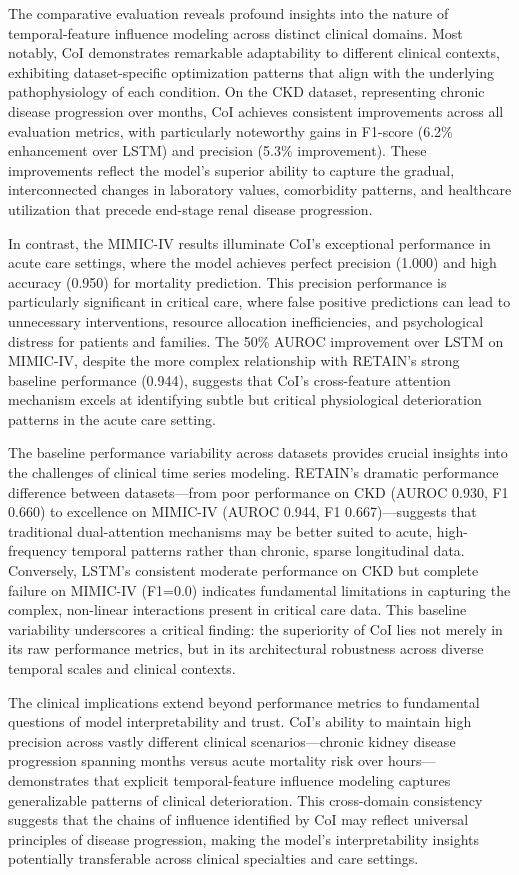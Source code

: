 \documentclass[letterpaper]{article}
\begin{document}
\begin{enumerate}
The comparative evaluation reveals profound insights into the nature of temporal-feature influence modeling across distinct clinical domains. Most notably, CoI demonstrates remarkable adaptability to different clinical contexts, exhibiting dataset-specific optimization patterns that align with the underlying pathophysiology of each condition. On the CKD dataset, representing chronic disease progression over months, CoI achieves consistent improvements across all evaluation metrics, with particularly noteworthy gains in F1-score (6.2\% enhancement over LSTM) and precision (5.3\% improvement). These improvements reflect the model's superior ability to capture the gradual, interconnected changes in laboratory values, comorbidity patterns, and healthcare utilization that precede end-stage renal disease progression.

In contrast, the MIMIC-IV results illuminate CoI's exceptional performance in acute care settings, where the model achieves perfect precision (1.000) and high accuracy (0.950) for mortality prediction. This precision performance is particularly significant in critical care, where false positive predictions can lead to unnecessary interventions, resource allocation inefficiencies, and psychological distress for patients and families. The 50\% AUROC improvement over LSTM on MIMIC-IV, despite the more complex relationship with RETAIN's strong baseline performance (0.944), suggests that CoI's cross-feature attention mechanism excels at identifying subtle but critical physiological deterioration patterns in the acute care setting.

The baseline performance variability across datasets provides crucial insights into the challenges of clinical time series modeling. RETAIN's dramatic performance difference between datasets—from poor performance on CKD (AUROC 0.930, F1 0.660) to excellence on MIMIC-IV (AUROC 0.944, F1 0.667)—suggests that traditional dual-attention mechanisms may be better suited to acute, high-frequency temporal patterns rather than chronic, sparse longitudinal data. Conversely, LSTM's consistent moderate performance on CKD but complete failure on MIMIC-IV (F1=0.0) indicates fundamental limitations in capturing the complex, non-linear interactions present in critical care data. This baseline variability underscores a critical finding: the superiority of CoI lies not merely in its raw performance metrics, but in its architectural robustness across diverse temporal scales and clinical contexts.

The clinical implications extend beyond performance metrics to fundamental questions of model interpretability and trust. CoI's ability to maintain high precision across vastly different clinical scenarios—chronic kidney disease progression spanning months versus acute mortality risk over hours—demonstrates that explicit temporal-feature influence modeling captures generalizable patterns of clinical deterioration. This cross-domain consistency suggests that the chains of influence identified by CoI may reflect universal principles of disease progression, making the model's interpretability insights potentially transferable across clinical specialties and care settings.


\end{enumerate}
\end{document}
